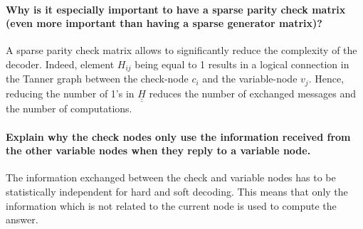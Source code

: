 \paragraph{Why is it especially important to have a sparse parity check matrix (even more important	than having a sparse generator matrix)?} \mbox{}

A sparse parity check matrix allows to significantly reduce the complexity of the decoder. Indeed, element $H_{ij}$ being equal to 1 results in a logical connection in the Tanner graph between the check-node $c_i$ and the variable-node $v_j$. Hence, reducing the number of 1's in $\underline{\underline{H}}$ reduces the number of exchanged messages and the number of computations.

\paragraph{Explain why the check nodes only use the information received from the other variable nodes when they reply to a variable node.} \mbox{}

The information exchanged between the check and variable nodes has to be statistically independent for hard and soft decoding. This means that only the information which is not related to the current node is used to compute the answer.
